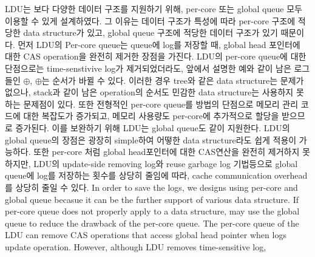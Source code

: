 \ifkor
LDU는 보다 다양한 데이터 구조를 지원하기 위해, per-core 또는 global queue 모두 이용할 수 있게 설계하였다.
그 이유는 데이터 구조가 특성에 따라 per-core 구조에 적당한 data structure가 있고,
global queue 구조에 적당한 데이터 구조가 있기 때문이다.
먼저 LDU의 Per-core queue는 queue에 log를 저장할 때, global head 포인터에 대한 CAS operation을
완전히 제거한 장점을 가진다.
LDU의 per-core queue에 대한 단점으로는 time-senstivive log가 제거되었더라도,
앞에서 설명한 예와 같이 남은 로그들인 $\oplus$, $\oplus$는 순서가 바뀔 수 있다.
이러한 경우 tree와 같은 data structure는 문제가 없으나, stack과 같이 남은 operation의
순서도 민감한 data structure는 사용하지 못하는 문제점이 있다.
또한 전형적인 per-core queue를 방법의 단점으로 메모리 관리 코드에 대한 복잡도가 증가되고, 
메모리 사용량도 per-core에 추가적으로 할당을 받으므로 증가된다.
이를 보완하기 위해 LDU는 global queue도 같이 지원한다.
LDU의 global queue의 장점은 광장히 simple하여 어떻한 data structure라도 쉽게 적용이 가능하다.
또한 per-core 처럼 global head포인터에 대한 CAS연산을 완전히 제거하지 못하지만, LDU의 update-side
removing log와 reuse garbage log 기법등으로 global queue에 log를 저장하는 횟수를 상당히 줄임에 따라,
cache communication overhead를 상당히 줄일 수 있다.
\else
In order to save the logs, we designs using per-core and global queue becasue
it can be the further support of various data structure.
If per-core queue does not properly apply to a data structure, may use the
global queue to reduce the drawback of the per-core queue.
The per-core queue of the LDU can remove CAS operations that access global head
pointer when logs update operation. 
However, although LDU removes time-sensitive log, 
